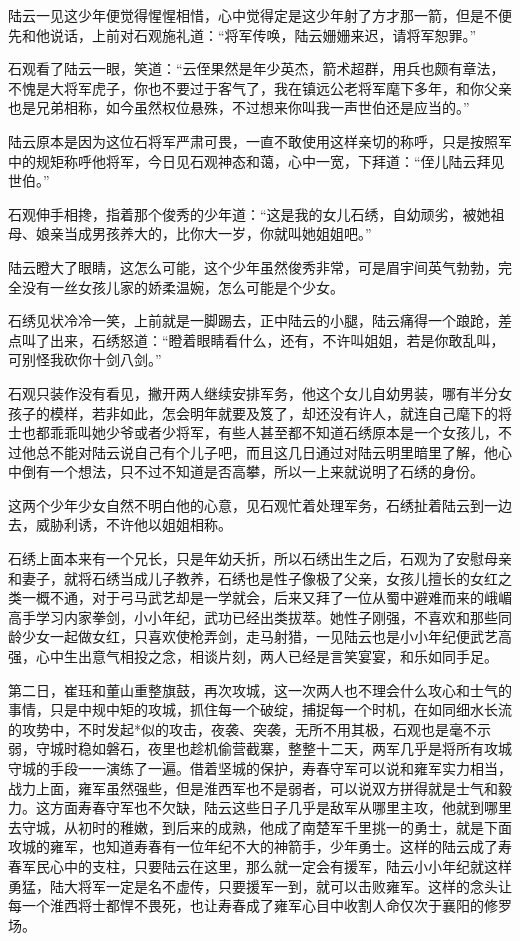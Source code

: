 陆云一见这少年便觉得惺惺相惜，心中觉得定是这少年射了方才那一箭，但是不便先和他说话，上前对石观施礼道：“将军传唤，陆云姗姗来迟，请将军恕罪。”

石观看了陆云一眼，笑道：“云侄果然是年少英杰，箭术超群，用兵也颇有章法，不愧是大将军虎子，你也不要过于客气了，我在镇远公老将军麾下多年，和你父亲也是兄弟相称，如今虽然权位悬殊，不过想来你叫我一声世伯还是应当的。”

陆云原本是因为这位石将军严肃可畏，一直不敢使用这样亲切的称呼，只是按照军中的规矩称呼他将军，今日见石观神态和蔼，心中一宽，下拜道：“侄儿陆云拜见世伯。”

石观伸手相搀，指着那个俊秀的少年道：“这是我的女儿石绣，自幼顽劣，被她祖母、娘亲当成男孩养大的，比你大一岁，你就叫她姐姐吧。”

陆云瞪大了眼睛，这怎么可能，这个少年虽然俊秀非常，可是眉宇间英气勃勃，完全没有一丝女孩儿家的娇柔温婉，怎么可能是个少女。

石绣见状冷冷一笑，上前就是一脚踢去，正中陆云的小腿，陆云痛得一个踉跄，差点叫了出来，石绣怒道：“瞪着眼睛看什么，还有，不许叫姐姐，若是你敢乱叫，可别怪我砍你十剑八剑。”

石观只装作没有看见，撇开两人继续安排军务，他这个女儿自幼男装，哪有半分女孩子的模样，若非如此，怎会明年就要及笈了，却还没有许人，就连自己麾下的将士也都乖乖叫她少爷或者少将军，有些人甚至都不知道石绣原本是一个女孩儿，不过他总不能对陆云说自己有个儿子吧，而且这几日通过对陆云明里暗里了解，他心中倒有一个想法，只不过不知道是否高攀，所以一上来就说明了石绣的身份。

这两个少年少女自然不明白他的心意，见石观忙着处理军务，石绣扯着陆云到一边去，威胁利诱，不许他以姐姐相称。

石绣上面本来有一个兄长，只是年幼夭折，所以石绣出生之后，石观为了安慰母亲和妻子，就将石绣当成儿子教养，石绣也是性子像极了父亲，女孩儿擅长的女红之类一概不通，对于弓马武艺却是一学就会，后来又拜了一位从蜀中避难而来的峨嵋高手学习内家拳剑，小小年纪，武功已经出类拔萃。她性子刚强，不喜欢和那些同龄少女一起做女红，只喜欢使枪弄剑，走马射猎，一见陆云也是小小年纪便武艺高强，心中生出意气相投之念，相谈片刻，两人已经是言笑宴宴，和乐如同手足。

第二日，崔珏和董山重整旗鼓，再次攻城，这一次两人也不理会什么攻心和士气的事情，只是中规中矩的攻城，抓住每一个破绽，捕捉每一个时机，在如同细水长流的攻势中，不时发起*似的攻击，夜袭、突袭，无所不用其极，石观也是毫不示弱，守城时稳如磐石，夜里也趁机偷营截寨，整整十二天，两军几乎是将所有攻城守城的手段一一演练了一遍。借着坚城的保护，寿春守军可以说和雍军实力相当，战力上面，雍军虽然强些，但是淮西军也不是弱者，可以说双方拼得就是士气和毅力。这方面寿春守军也不欠缺，陆云这些日子几乎是敌军从哪里主攻，他就到哪里去守城，从初时的稚嫩，到后来的成熟，他成了南楚军千里挑一的勇士，就是下面攻城的雍军，也知道寿春有一位年纪不大的神箭手，少年勇士。这样的陆云成了寿春军民心中的支柱，只要陆云在这里，那么就一定会有援军，陆云小小年纪就这样勇猛，陆大将军一定是名不虚传，只要援军一到，就可以击败雍军。这样的念头让每一个淮西将士都悍不畏死，也让寿春成了雍军心目中收割人命仅次于襄阳的修罗场。

